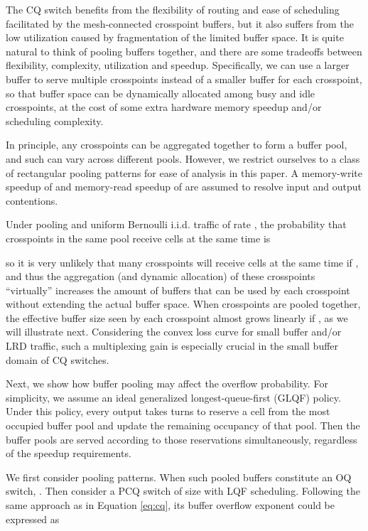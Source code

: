 \documentclass[journal,final,doublecolumn,10pt,twoside]{IEEEtranTCOM} \normalsize
\begin{document}
The CQ switch benefits from the flexibility of routing and ease of scheduling facilitated by the mesh-connected crosspoint buffers, but it also suffers from the low utilization caused by fragmentation of the limited buffer space. It is quite natural to think of pooling buffers together, and there are some tradeoffs between flexibility, complexity, utilization and speedup. Specifically, we can use a larger buffer to serve multiple crosspoints instead of a smaller buffer for each crosspoint, so that buffer space can be dynamically allocated among busy and idle crosspoints, at the cost of some extra hardware memory speedup and/or scheduling complexity.










In principle, any  crosspoints can be aggregated together to form a buffer pool, and such  can vary across different pools. However, we restrict ourselves to a class of  rectangular pooling patterns for ease of analysis in this paper. 
A memory-write speedup of  and memory-read speedup of  are assumed to resolve input and output contentions.

Under  pooling and uniform Bernoulli i.i.d. traffic of rate , the probability that  crosspoints in the same pool receive cells at the same time is 

so it is very unlikely that many crosspoints will receive cells at the same time if , and thus the aggregation (and dynamic allocation) of these crosspoints ``virtually'' increases the amount of buffers that can be used by each crosspoint without extending the actual buffer space. When  crosspoints are pooled together, the effective buffer size seen by each crosspoint almost grows linearly if , as we will illustrate next. Considering the convex loss curve for small buffer and/or LRD traffic, such a multiplexing gain is especially crucial in the small buffer domain of CQ switches.

Next, we show how buffer pooling may affect the overflow probability. For simplicity, we assume an ideal generalized longest-queue-first (GLQF) policy. Under this policy, every output takes turns to reserve a cell from the most occupied buffer pool and update the remaining occupancy of that pool. Then the buffer pools are served according to those reservations simultaneously, regardless of the speedup requirements.

We first consider  pooling patterns. When  such pooled buffers constitute an OQ switch, .
Then consider a PCQ switch of size  with LQF scheduling. Following the same approach as in Equation \ref{eq:cq}, its buffer overflow exponent could be expressed as
\end{document}
